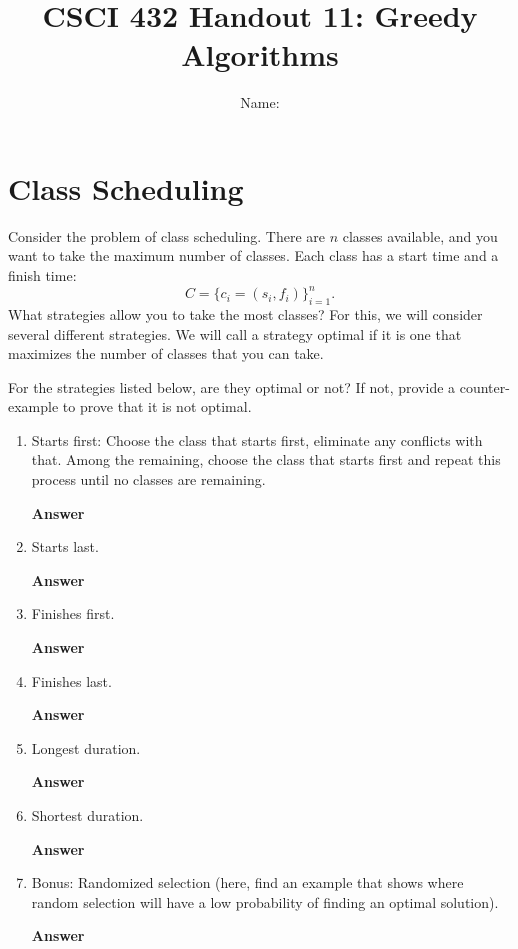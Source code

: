 \documentclass{article}
\title{CSCI 432 Handout 11: Greedy Algorithms}
\author{Name: \rule{3in}{0.15mm}}
\begin{document}
\maketitle

\section*{Class Scheduling}

Consider the problem of class scheduling. There are $n$ classes available, and
you want to take the maximum number of classes.  Each class has a start time and
a finish time:
$$ C = \{ c_i =(s_i,f_i) \}_{i=1}^n.$$
What strategies allow you to take the most classes? For this, we will consider
several different strategies. We will call a strategy optimal if it is one that
maximizes the number of classes that you can take.

For the strategies listed
below, are they optimal or not? If not, provide a counter-example to prove that
it is not optimal.

\begin{enumerate}
    \item Starts first: Choose the class that starts first, eliminate any
        conflicts with that. Among the remaining, choose the class that starts
        first and repeat this process until no classes are remaining.

        \textbf{Answer}
        \vspace{1in}

    \item Starts last.

        \textbf{Answer}
        \vspace{1in}

    \item Finishes first.

        \textbf{Answer}
        \vspace{1in}

    \item Finishes last.

        \textbf{Answer}
        \vspace{1in}

    \item Longest duration.

        \textbf{Answer}
        \vspace{1in}

    \item Shortest duration.

        \textbf{Answer}
        \vspace{1in}

    \item Bonus: Randomized selection (here, find an example that shows where
        random selection will have a low probability of finding an optimal
        solution).

        \textbf{Answer}
        \vspace{1in}

\end{enumerate}
\end{document}
